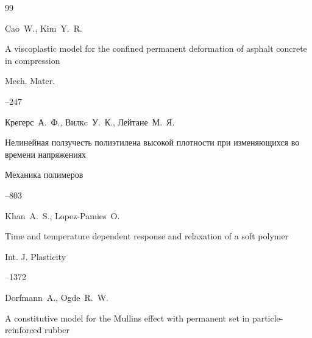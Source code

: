 \begin{thebibliography}{99}

\by Cao~W., Kim~Y.~R.

\paper A viscoplastic model for the confined permanent deformation of asphalt concrete in compression 

\jour Mech. Mater.



--247







\by Крегерс~А.~Ф., Вилкc~У.~К., Лейтане~М.~Я. 

\paper Нелинейная ползучесть полиэтилена высокой плотности при изменяющихся во времени напряжениях

\jour Механика полимеров



--803












\by Khan~A.~S., Lopez-Pamies~O.

\paper Time and temperature dependent response and relaxation of a soft polymer 

\jour Int. J. Plasticity




--1372







\by Dorfmann~A., Ogde~R.~W. 

\paper A constitutive model for the Mullins effect with permanent set in particle-reinforced rubber


\end{thebibliography}
